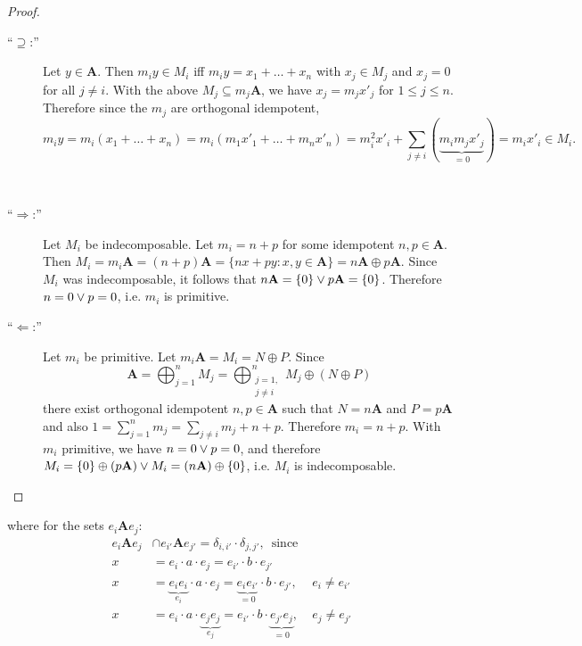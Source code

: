 \begin{proof}[Proof\nopunct]
\begin{subproof}[Proof that $M_{i} = m_{i}\mathbf{A}$]
\begin{description}
\item[``$\supseteq$:''] Let $y \in \mathbf{A}$. Then $m_{i}y \in M_{i}$ iff $m_{i}y = x_{1}+\dots+x_{n}$ with $x_{j}\in M_{j}$ and
$x_{j} = 0$ for all $j \neq i$. With the above $M_{j} \subseteq m_{j}\mathbf{A}$, we have $x_{j} = m_{j}x'_{j}$ for $1\leq j \leq n$. Therefore
since the $m_{j}$ are orthogonal idempotent,
\[
m_{i}y = m_{i}(x_{1}+\dots+x_{n}) = m_{i}(m_{1}x'_{1}+\dots+m_{n}x'_{n}) = m_{i}^{2}x'_{i} +
\sum_{j\neq i} (\underbrace{m_{i}m_{j}x'_{j}}_{=0}) = m_{i}x'_{i} \in M_{i}.
\]
\end{description}
\end{subproof}
\begin{subproof}\phantom{}\\
\begin{description}
\item[``$\Rightarrow$:''] Let $M_{i}$ be indecomposable. Let $m_{i} = n + p$ for some idempotent $n, p \in \mathbf{A}$. Then
$M_{i} = m_{i}\mathbf{A} = (n+p)\mathbf{A} = \{nx + py : x,y \in \mathbf{A}\} = n\mathbf{A} \oplus p\mathbf{A}$. Since $M_{i}$ was
indecomposable, it follows that $n\mathbf{A} = \{0\} \vee p\mathbf{A} = \{0\}$. Therefore $n = 0 \vee p = 0$, i.e. $m_{i}$ is primitive.

\item[``$\Leftarrow$:''] Let $m_{i}$ be primitive. Let $m_{i}\mathbf{A} = M_{i} = N \oplus P$. Since
\[
\mathbf{A} = \bigoplus_{j=1}^{n} M_{j} = \bigoplus_{\begin{smallmatrix}j=1,\\ j \neq i\end{smallmatrix}}^{n} M_{j} \oplus (N \oplus P)
\]
there exist orthogonal idempotent $n, p \in \mathbf{A}$ such that $N = n\mathbf{A}$ and $P = p\mathbf{A}$ and also
$1 = \sum_{j=1}^{n} m_{j} = \sum_{j\neq i} m_{j} + n + p$. Therefore $m_{i} = n + p$. With $m_{i}$ primitive, we have
$n = 0 \vee p = 0$, and therefore $M_{i} = \{0\} \oplus (p\mathbf{A}) \vee M_{i} = (n\mathbf{A}) \oplus \{0\}$, i.e. $M_{i}$ is indecomposable.
\end{description}
\end{subproof}
\end{proof}

where for the sets $e_{i}\mathbf{A}e_{j}$:
\begin{align}
e_{i}\mathbf{A}e_{j} &\cap e_{i'}\mathbf{A}e_{j'} = \delta_{i,i'} \cdot \delta_{j,j'},\,\text{ since }\\
x &= e_{i} \cdot a \cdot e_{j} = e_{i'} \cdot b \cdot e_{j'} \\
x &= \underbrace{e_{i}e_{i}}_{e_{i}} \cdot a \cdot e_{j} = \underbrace{e_{i}e_{i'}}_{= 0} \cdot b \cdot e_{j'},\, &e_{i} \neq e_{i'} \\
x &= e_{i} \cdot a \cdot \underbrace{e_{j}e_{j}}_{e_{j}} = e_{i'} \cdot b \cdot \underbrace{e_{j'}e_{j}}_{= 0},\, &e_{j} \neq e_{j'}
\end{align}

